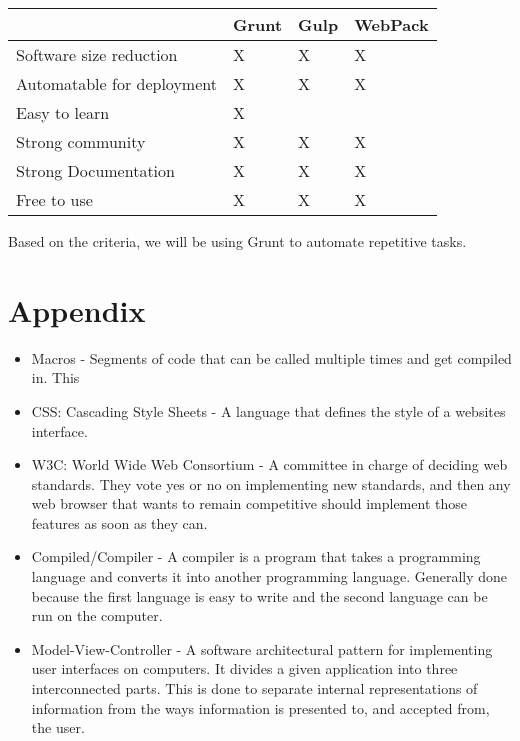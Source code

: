 \documentclass[draftclsnofoot,onecolumn,letterpaper,10pt,compsoc]{IEEEtran}
\begin{document}
		    \begin{center}
		            \begin{tabular}{| m{15em} | m{10em} | m{10em} | m{10em} |}
		                \hline
		                    & Grunt & Gulp & WebPack \\

		                \hline
		                    Software size reduction & X & X & X \\

		                \hline
		                    Automatable for deployment & X & X & X \\

		                \hline
		                    Easy to learn & X &  &  \\

		                \hline
		                    Strong community & X & X & X \\

		                \hline
		                    Strong Documentation & X & X & X \\

		                \hline
		                    Free to use & X & X & X \\

		                \hline
		            \end{tabular}
		        \end{center}

		        Based on the criteria, we will be using Grunt to automate repetitive tasks.

					\clearpage

\section{Appendix}

  \begin{itemize}
    \item Macros - Segments of code that can be called multiple times and get compiled in. This
    \item CSS: Cascading Style Sheets - A language that defines the style of a websites interface.
    \item W3C: World Wide Web Consortium - A committee in charge of deciding web standards. They vote yes or no on implementing new standards, and then any web browser that wants to remain competitive should implement those features as soon as they can.
    \item Compiled/Compiler - A compiler is a program that takes a programming language and converts it into another programming language. Generally done because the first language is easy to write and the second language can be run on the computer.
    \item Model-View-Controller - A software architectural pattern for implementing user interfaces on computers. It divides a given application into three interconnected parts. This is done to separate internal representations of information from the ways information is presented to, and accepted from, the user.
  \end{itemize}
\end{document}
